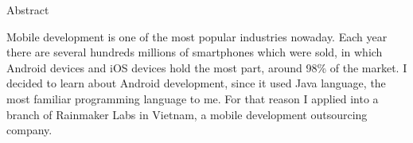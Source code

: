 \newpage
\begin{center}
{\huge Abstract}
\end{center}

Mobile development is one of the most popular industries nowaday. Each year there are several hundreds millions of smartphones which were sold, in which Android devices and iOS devices hold the most part, around 98\% of the market. I decided to learn about Android development, since it used Java language, the most familiar programming language to me. For that reason I applied into a branch of Rainmaker Labs in Vietnam, a mobile development outsourcing company.